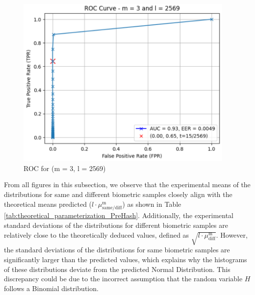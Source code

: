 \begin{enumerate}
\begin{itemize}
            \begin{figure}[H]
                    \centering
                    \includegraphics[width=\linewidth,height=8.5cm,keepaspectratio]{latex-img/FNR-FPR_ROC_TPR_config3.png}
                    \caption{ROC for (m = 3, l = 2569)}
                    \label{FNR-FPR_ROC_TPR_config3}
            \end{figure}
        \end{itemize}
\end{enumerate}

From all figures in this subsection, we observe that the experimental means of the distributions for same and different biometric samples closely align with the theoretical means predicted (\(l\cdot\mu_{\text{same/diff}}^\text{m}\)) as shown in Table \ref{tab:theoretical_parameterization_PreHash}. Additionally, the experimental standard deviations of the distributions for different biometric samples are relatively close to the theoretically deduced values, defined as \(\sqrt{l\cdot\mu_{\text{diff}}^\text{m}}\). However, the standard deviations of the distributions for same biometric samples are significantly larger than the predicted values, which explains why the histograms of these distributions deviate from the predicted Normal Distribution. This discrepancy could be due to the incorrect assumption that the random variable \(H\) follows a Binomial distribution. 

